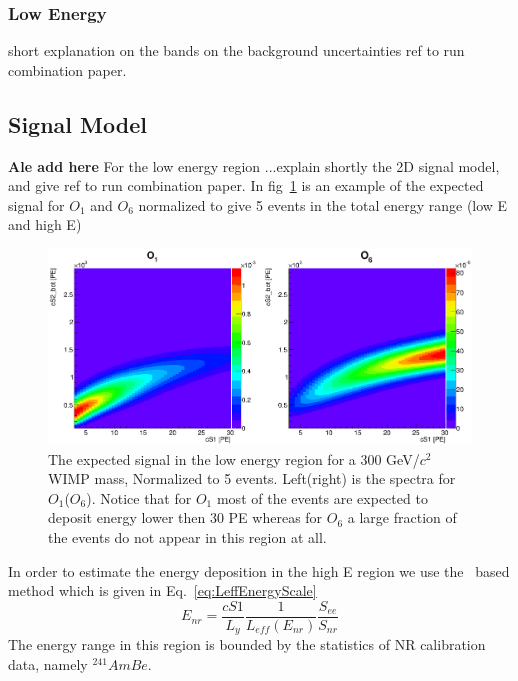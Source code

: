 \subsubsection{Low Energy}
\label{subsubsec:LowE}
short explanation on the bands on the background  uncertainties ref to run combination paper.


\subsection{Signal Model}
\label{subsec:SignalModel}
\textbf{Ale add here} For the low energy region ...explain shortly the 2D signal model, and give ref to run combination paper. In fig~\ref{fig:LowE} is an example of the expected signal for $O_1$ and $O_6$ normalized to give 5 events in the total energy range (low E and high E)
\begin{figure}[h!]
\begin{minipage}{1.\linewidth}
\centerline{\includegraphics[width=1.\linewidth]{Figures/SigLowO1O6.eps}}
\end{minipage}
\caption{The expected signal in the low energy region for a 300 GeV/$c^2$ WIMP mass, Normalized to 5 events. Left(right) is the spectra for $O_1$($O_6$). Notice that for $O_1$ most of the events are expected to deposit energy lower then 30 PE whereas for $O_6$ a large fraction of the events do not appear in this region at all.}
\label{fig:LowE}
\end{figure}

In order to estimate the energy deposition in the high E region we use the \Leff\ based method which is given in Eq.~\ref{eq:LeffEnergyScale}
\begin{equation}
\label{eq:LeffEnergyScale}
	E_{nr} = \frac{cS1}{L_y} \frac{1}{L_{eff}(E_{nr})} \frac{S_{ee}}{S_{nr}}
\end{equation}
The energy range in this region is bounded by the statistics of NR calibration data, namely $^{241}AmBe$.

